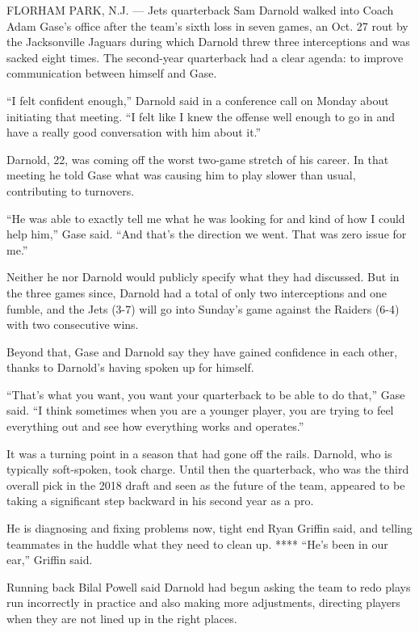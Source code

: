 FLORHAM PARK, N.J. --- Jets quarterback Sam Darnold walked into Coach
Adam Gase's office after the team's sixth loss in seven games, an Oct.
27 rout by the Jacksonville Jaguars during which Darnold threw three
interceptions and was sacked eight times. The second-year quarterback
had a clear agenda: to improve communication between himself and Gase.

``I felt confident enough,'' Darnold said in a conference call on Monday
about initiating that meeting. ``I felt like I knew the offense well
enough to go in and have a really good conversation with him about it.''

Darnold, 22, was coming off the worst two-game stretch of his career. In
that meeting he told Gase what was causing him to play slower than
usual, contributing to turnovers.

``He was able to exactly tell me what he was looking for and kind of how
I could help him,'' Gase said. ``And that's the direction we went. That
was zero issue for me.''

Neither he nor Darnold would publicly specify what they had discussed.
But in the three games since, Darnold had a total of only two
interceptions and one fumble, and the Jets (3-7) will go into Sunday's
game against the Raiders (6-4) with two consecutive wins.

Beyond that, Gase and Darnold say they have gained confidence in each
other, thanks to Darnold's having spoken up for himself.

``That's what you want, you want your quarterback to be able to do
that,'' Gase said. ``I think sometimes when you are a younger player,
you are trying to feel everything out and see how everything works and
operates.''

It was a turning point in a season that had gone off the rails. Darnold,
who is typically soft-spoken, took charge. Until then the quarterback,
who was the third overall pick in the 2018 draft and seen as the future
of the team, appeared to be taking a significant step backward in his
second year as a pro.

He is diagnosing and fixing problems now, tight end Ryan Griffin said,
and telling teammates in the huddle what they need to clean up. ****
``He's been in our ear,'' Griffin said.

Running back Bilal Powell said Darnold had begun asking the team to redo
plays run incorrectly in practice and also making more adjustments,
directing players when they are not lined up in the right places.

